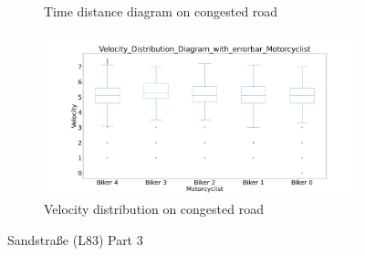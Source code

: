 \begin{figure}[H]
\begin{subfigure}[b]{0.45\textwidth}
		\caption{Time distance diagram on congested road}
	\end{subfigure}
	\hfill
	\begin{subfigure}[b]{0.45\textwidth}
		\centering
		\includegraphics[width=1.0\textwidth]{images/Sandstrase/Sandstrase_Velocity_Distribution_Diagram_with_errorbar_congested.png}
		\caption{Velocity distribution on congested road}
	\end{subfigure}
	\caption{Sandstraße (L83) Part 3}
\end{figure}




